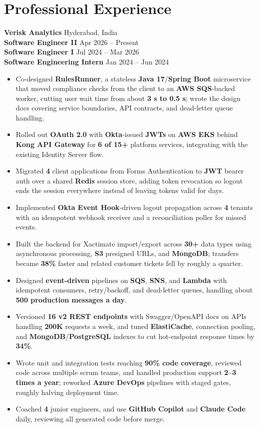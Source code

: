 \documentclass[a4paper,10pt]{article}
\begin{document}
\section*{Professional Experience}

\textbf{Verisk Analytics} \hfill Hyderabad, India \\
\textbf{Software Engineer II} \hfill Apr 2026 -- Present \\
\textbf{Software Engineer I} \hfill Jul 2024 -- Mar 2026 \\
\textbf{Software Engineering Intern} \hfill Jan 2024 -- Jun 2024

\begin{itemize}[leftmargin=*]
    \item Co-designed \textbf{RulesRunner}, a stateless \textbf{Java 17}/\textbf{Spring Boot} microservice that moved compliance checks from the client to an \textbf{AWS SQS}-backed worker, cutting user wait time from about \textbf{3 s to 0.5 s}; wrote the design docs covering service boundaries, API contracts, and dead-letter queue handling.
    \item Rolled out \textbf{OAuth 2.0} with \textbf{Okta}-issued \textbf{JWTs} on \textbf{AWS EKS} behind \textbf{Kong API Gateway} for \textbf{6 of 15+} platform services, integrating with the existing Identity Server flow.
    \item Migrated \textbf{4} client applications from Forms Authentication to \textbf{JWT} bearer auth over a shared \textbf{Redis} session store, adding token revocation so logout ends the session everywhere instead of leaving tokens valid for days.
    \item Implemented \textbf{Okta Event Hook}-driven logout propagation across \textbf{4} tenants with an idempotent webhook receiver and a reconciliation poller for missed events.
    \item Built the backend for Xactimate import/export across \textbf{30+} data types using asynchronous processing, \textbf{S3} presigned URLs, and \textbf{MongoDB}; transfers became \textbf{38\%} faster and related customer tickets fell by roughly a quarter.
    \item Designed \textbf{event-driven} pipelines on \textbf{SQS}, \textbf{SNS}, and \textbf{Lambda} with idempotent consumers, retry/backoff, and dead-letter queues, handling about \textbf{500 production messages a day}.
    \item Versioned \textbf{16 v2 REST endpoints} with Swagger/OpenAPI docs on APIs handling \textbf{200K} requests a week, and tuned \textbf{ElastiCache}, connection pooling, and \textbf{MongoDB}/\textbf{PostgreSQL} indexes to cut hot-endpoint response times by \textbf{34\%}.
    \item Wrote unit and integration tests reaching \textbf{90\% code coverage}, reviewed code across multiple scrum teams, and handled production support \textbf{2--3 times a year}; reworked \textbf{Azure DevOps} pipelines with staged gates, roughly halving deployment time.
    \item Coached \textbf{4} junior engineers, and use \textbf{GitHub Copilot} and \textbf{Claude Code} daily, reviewing all generated code before merge.
\end{itemize}
\end{document}
